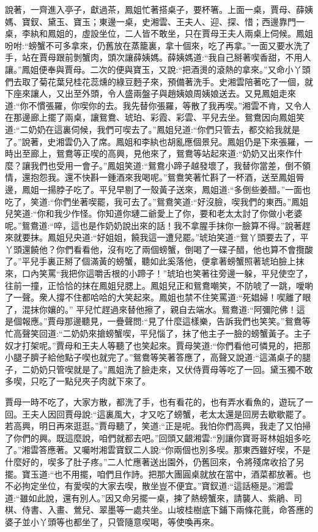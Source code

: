 \begin{parag}
    說著，一齊進入亭子，獻過茶，鳳姐忙著搭桌子，要杯箸。上面一桌，賈母、薛姨媽、寶釵、黛玉、寶玉；東邊一桌，史湘雲、王夫人、迎、探、惜；西邊靠門一桌，李紈和鳳姐的，虛設坐位，二人皆不敢坐，只在賈母王夫人兩桌上伺候。鳳姐吩咐:“螃蟹不可多拿來，仍舊放在蒸籠裏，拿十個來，吃了再拿。”一面又要水洗了手，站在賈母跟前剝蟹肉，頭次讓薛姨媽。薛姨媽道:“我自己掰著喫香甜，不用人讓。”鳳姐便奉與賈母。二次的便與寶玉，又說:“把酒燙的滾熱的拿來。”又命小丫頭們去取了菊花葉兒桂花蕊燻的綠豆麪子來，預備著洗手。史湘雲陪著吃了一個，就下座來讓人，又出至外頭，令人盛兩盤子與趙姨娘周姨娘送去。又見鳳姐走來道:“你不慣張羅，你喫你的去。我先替你張羅，等散了我再喫。”湘雲不肯，又令人在那邊廊上擺了兩桌，讓鴛鴦、琥珀、彩霞、彩雲、平兒去坐。鴛鴦因向鳳姐笑道:“二奶奶在這裏伺候，我們可喫去了。”鳳姐兒道:“你們只管去，都交給我就是了。”說著，史湘雲仍入了席。鳳姐和李紈也胡亂應個景兒。鳳姐仍是下來張羅，一時出至廊上，鴛鴦等正喫的高興，見他來了，鴛鴦等站起來道:“奶奶又出來作什麼？讓我們也受用一會子。”鳳姐笑道:“鴛鴦小蹄子越發壞了，我替你當差，倒不領情，還抱怨我。還不快斟一鍾酒來我喝呢。”鴛鴦笑著忙斟了一杯酒，送至鳳姐脣邊，鳳姐一揚脖子吃了。平兒早剔了一殼黃子送來，鳳姐道:“多倒些姜醋。”一面也吃了，笑道:“你們坐著喫罷，我可去了。”鴛鴦笑道:“好沒臉，喫我們的東西。”鳳姐兒笑道:“你和我少作怪。你知道你璉二爺愛上了你，要和老太太討了你做小老婆呢。”鴛鴦道:“啐，這也是作奶奶說出來的話！我不拿腥手抹你一臉算不得。”說著趕來就要抹。鳳姐兒央道:“好姐姐，饒我這一遭兒罷。”琥珀笑道:“鴛丫頭要去了，平丫頭還饒他？你們看看他，沒有吃了兩個螃蟹，倒喝了一碟子醋，他也算不會攬酸了。”平兒手裏正掰了個滿黃的螃蟹，聽如此奚落他，便拿著螃蟹照著琥珀臉上抹來，口內笑罵“我把你這嚼舌根的小蹄子！”琥珀也笑著往旁邊一躲，平兒使空了，往前一撞，正恰恰的抹在鳳姐兒腮上。鳳姐兒正和鴛鴦嘲笑，不防唬了一跳，噯喲了一聲。衆人撐不住都哈哈的大笑起來。鳳姐也禁不住笑罵道:“死娼婦！喫離了眼了，混抹你孃的。” 平兒忙趕過來替他擦了，親自去端水。鴛鴦道:“阿彌陀佛！這是個報應。”賈母那邊聽見，一疊聲問:“見了什麼這樣樂，告訴我們也笑笑。”鴛鴦等忙高聲笑回道:“二奶奶來搶螃蟹喫，平兒惱了，抹了他主子一臉的螃蟹黃子。主子奴才打架呢。”賈母和王夫人等聽了也笑起來。賈母笑道:“你們看他可憐見的，把那小腿子臍子給他點子喫也就完了。”鴛鴦等笑著答應了，高聲又說道:“這滿桌子的腿子，二奶奶只管喫就是了。”鳳姐洗了臉走來，又伏侍賈母等吃了一回。黛玉獨不敢多喫，只吃了一點兒夾子肉就下來了。
\end{parag}


\begin{parag}
    賈母一時不吃了，大家方散，都洗了手，也有看花的，也有弄水看魚的，遊玩了一回。王夫人因回賈母說:“這裏風大，才又吃了螃蟹，老太太還是回房去歇歇罷了。若高興，明日再來逛逛。”賈母聽了，笑道:“正是呢。我怕你們高興，我走了又怕掃了你們的興。既這麼說，咱們就都去吧。”回頭又齦湘雲:“別讓你寶哥哥林姐姐多吃了。”湘雲答應著。又囑咐湘雲寶釵二人說:“你兩個也別多喫。那東西雖好喫，不是什麼好的，喫多了肚子疼。”二人忙應著送出園外，仍舊回來，令將殘席收拾了另擺。寶玉道:“也不用擺，咱們且作詩。把那大團圓桌就放在當中，酒菜都放著。也不必拘定坐位，有愛喫的大家去喫，散坐豈不便宜。”寶釵道:“這話極是。”湘雲道:“雖如此說，還有別人。”因又命另擺一桌，揀了熱螃蟹來，請襲人、紫鵑、司棋、侍書、入畫、鶯兒、翠墨等一處共坐。山坡桂樹底下鋪下兩條花氈，命答應的婆子並小丫頭等也都坐了，只管隨意喫喝，等使喚再來。
\end{parag}


